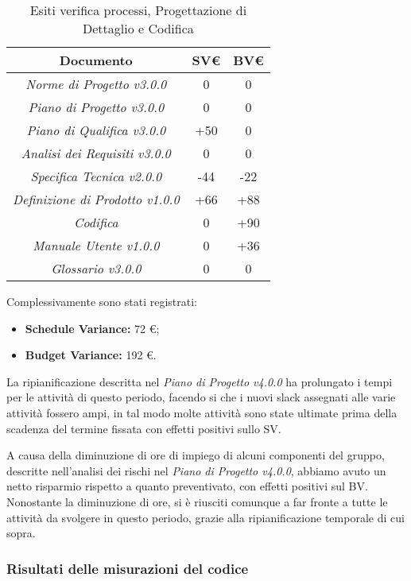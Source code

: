 \begin{table}[h]
	\begin{tabular}{|c|c|c|}
		\toprule
			\textbf{Documento} & \textbf{SV\euro} & \textbf{BV\euro} \\ 
		\midrule
		\midrule
			\textit{Norme di Progetto v3.0.0} & 0 & 0 \\  
			\textit{Piano di Progetto v3.0.0} & 0 & 0 \\ 
			\textit{Piano di Qualifica v3.0.0} & +50 & 0 \\ 
			\textit{Analisi dei Requisiti v3.0.0} & 0 & 0 \\
			\textit{Specifica Tecnica v2.0.0} & -44 & -22 \\ 
			\textit{Definizione di Prodotto v1.0.0} & +66 & +88 \\
			\textit{Codifica} & 0 & +90 \\
			\textit{Manuale Utente v1.0.0} & 0 & +36 \\
			\textit{Glossario v3.0.0} & 0 & 0 \\ 
		\bottomrule
	\end{tabular}
\caption{Esiti verifica processi, Progettazione di Dettaglio e Codifica}
\end{table}

\noindent Complessivamente sono stati registrati:
\begin{itemize}
	\item \textbf{Schedule Variance:} 72 \euro;
	\item \textbf{Budget Variance:} 192 \euro.
\end{itemize}

\noindent La ripianificazione descritta nel \textit{Piano di Progetto v4.0.0} ha prolungato i tempi per le attività di questo periodo, facendo si che i nuovi \gls{slack} assegnati alle varie attività fossero ampi, in tal modo molte attività sono state ultimate prima della scadenza del termine fissata con effetti positivi sullo SV.

\noindent A causa della diminuzione di ore di impiego di alcuni componenti del gruppo, descritte nell'analisi dei rischi nel \textit{Piano di Progetto v4.0.0}, abbiamo avuto un netto risparmio rispetto a quanto preventivato, con effetti positivi sul BV. Nonostante la diminuzione di ore, si è riusciti comunque a far fronte a tutte le attività da svolgere in questo periodo, grazie alla ripianificazione temporale di cui sopra.  

\subsubsection{Risultati delle misurazioni del codice}
\label{appendice 7}
\vspace{3mm}

